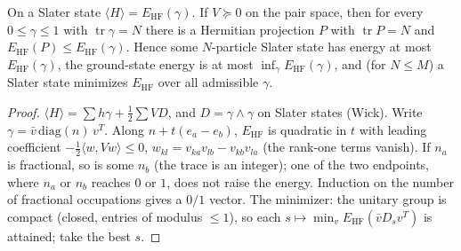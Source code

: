 \begin{theorem}\label{thm:lieb-variational}
  \leanok
  On a Slater state $\langle H\rangle=E_{\mathrm{HF}}(\gamma)$. If $V\succeq0$ on the pair space, then for every $0\le\gamma\le1$
  with $\operatorname{tr}\gamma=N$ there is a Hermitian projection $P$ with $\operatorname{tr}P=N$ and
  $E_{\mathrm{HF}}(P)\le E_{\mathrm{HF}}(\gamma)$. Hence some $N$-particle Slater state has energy at most $E_{\mathrm{HF}}(\gamma)$, the
  ground-state energy is at most $\inf_\gamma E_{\mathrm{HF}}(\gamma)$, and (for $N\le M$) a Slater state minimizes $E_{\mathrm{HF}}$ over
  all admissible $\gamma$.
\end{theorem}
\begin{proof}\leanok
  $\langle H\rangle=\sum h\gamma+\frac12\sum VD$, and $D=\gamma\wedge\gamma$ on Slater states (Wick). Write
  $\gamma=\bar v\,\mathrm{diag}(n)\,v^T$. Along $n+t(e_a-e_b)$, $E_{\mathrm{HF}}$ is quadratic in $t$ with leading coefficient
  $-\frac12\langle w,Vw\rangle\le0$, $w_{kl}=v_{ka}v_{lb}-v_{kb}v_{la}$ (the rank-one terms vanish). If $n_a$ is fractional, so is some
  $n_b$ (the trace is an integer); one of the two endpoints, where $n_a$ or $n_b$ reaches $0$ or $1$, does not raise the energy.
  Induction on the number of fractional occupations gives a $0/1$ vector. The minimizer: the unitary group is compact
  (closed, entries of modulus $\le1$), so each $s\mapsto\min_vE_{\mathrm{HF}}(\bar vD_sv^T)$ is attained; take the best $s$.
\end{proof}

